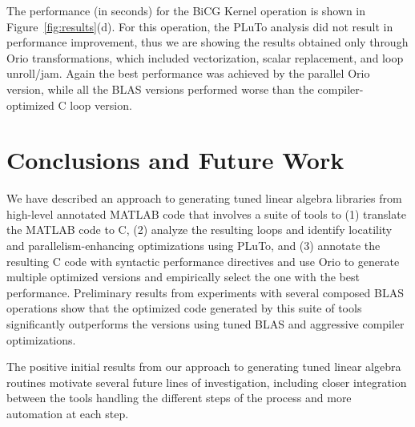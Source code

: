 \documentclass[runningheads]{llncs}
\begin{document}
The performance (in seconds) for the BiCG Kernel operation is shown in
Figure~\ref{fig:results}(d). For this operation, the PLuTo analysis did not
result in performance improvement, thus we are showing the results obtained
only through Orio transformations, which included vectorization, scalar
replacement, and loop unroll/jam. Again the best performance was achieved
by the parallel Orio version, while all the BLAS versions performed worse
than the compiler-optimized C loop version.

\section{Conclusions and Future Work}
\label{sec:conclusions}

We have described an approach to generating tuned linear algebra libraries
from high-level annotated MATLAB code that involves a suite of tools to (1)
translate the MATLAB code to C, (2) analyze the resulting loops and identify
locatility and parallelism-enhancing optimizations using PLuTo, and (3)
annotate the resulting C code with syntactic performance directives and use
Orio to generate multiple optimized versions and empirically select the one
with the best performance. Preliminary results from experiments with several
composed BLAS operations show that the optimized code generated by this suite
of tools significantly outperforms the versions using tuned BLAS and
aggressive compiler optimizations.

The positive initial results from our approach to generating tuned linear
algebra routines motivate several future lines of investigation, including closer
integration between the tools handling the different steps of the process and 
more automation at each step.

\end{document}
